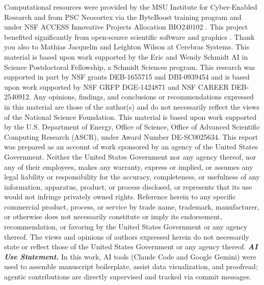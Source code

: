 \begin{acknowledgement}
\scriptsize
Computational resources were provided by the MSU Institute for Cyber-Enabled Research and from PSC Neocortex via the ByteBoost training program and under NSF ACCESS Innovative Projects Allocation BIO240102 \cite{buitrago2021neocortex,Boerner2023,Brashear2025}.
This project benefited significantly from open-source scientific software \cite{2020SciPy-NMeth,harris2020array,mckinney-proc-scipy-2010,waskom2021seaborn,hunter2007matplotlib,yang2025downstream,moreno2021signalgp,vostinar2024empirical,moreno2022hstrat,moreno2021conduit,moreno2024wse,moreno2026phyloframe} and graphics \cite{togopic2024_supercomputer,togopic2019_rackserver}.
Thank you also to Mathias Jacquelin and Leighton Wilson at Cerebras Systems.
This material is based upon work supported by the Eric and Wendy Schmidt AI in Science Postdoctoral Fellowship, a Schmidt Sciences program.
This research was supported in part by NSF grants DEB-1655715 and DBI-0939454 and is based upon work supported by NSF GRFP DGE-1424871 and NSF CAREER DEB-2540912.
Any opinions, findings, and conclusions or recommendations expressed in this material are those of the author(s) and do not necessarily reflect the views of the National Science Foundation.
This material is based upon work supported by the U.S. Department of Energy, Office of Science, Office of Advanced Scientific Computing Research (ASCR), under Award Number DE-SC0025634.
This report was prepared as an account of work sponsored by an agency of the United States Government.
Neither the United States Government nor any agency thereof, nor any of their employees, makes any warranty, express or implied, or assumes any legal liability or responsibility for the accuracy, completeness, or usefulness of any information, apparatus, product, or process disclosed, or represents that its use would not infringe privately owned rights.
Reference herein to any specific commercial product, process, or service by trade name, trademark, manufacturer, or otherwise does not necessarily constitute or imply its endorsement, recommendation, or favoring by the United States Government or any agency thereof.
The views and opinions of authors expressed herein do not necessarily state or reflect those of the United States Government or any agency thereof.
\textit{\textbf{AI Use Statement.}}
In this work, AI tools (Claude Code and Google Gemini) were used to assemble manuscript boilerplate, assist data visualization, and proofread; agentic contributions are directly supervised and tracked via commit messages.
\end{acknowledgement}


